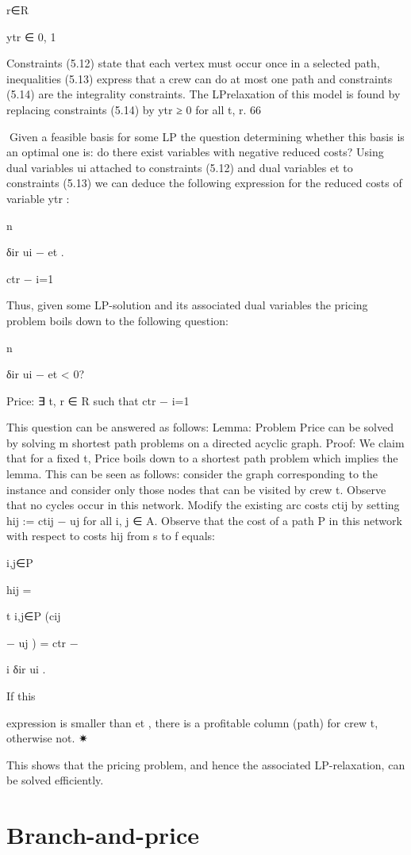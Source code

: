 r∈R

ytr ∈ {0, 1}

Constraints (5.12) state that each vertex must occur once in a selected path, inequalities (5.13) express
that a crew can do at most one path and constraints (5.14) are the integrality constraints. The LPrelaxation of this model is found by replacing constraints (5.14) by ytr ≥ 0 for all t, r.
66

Given a feasible basis for some LP the question determining whether this basis is an optimal one is: do
there exist variables with negative reduced costs? Using dual variables ui attached to constraints (5.12)
and dual variables et to constraints (5.13) we can deduce the following expression for the reduced costs
of variable ytr :

n

δir ui − et .

ctr −
i=1

Thus, given some LP-solution and its associated dual variables the pricing problem boils down to the
following question:

n

δir ui − et < 0?

Price: ∃ t, r ∈ R such that ctr −
i=1

This question can be answered as follows:
Lemma: Problem Price can be solved by solving m shortest path problems on a directed acyclic graph.
Proof: We claim that for a fixed t, Price boils down to a shortest path problem which implies the lemma.
This can be seen as follows: consider the graph corresponding to the instance and consider only those
nodes that can be visited by crew t. Observe that no cycles occur in this network. Modify the existing
arc costs ctij by setting hij := ctij − uj for all {i, j} ∈ A. Observe that the cost of a path P in this network
with respect to costs hij from s to f equals:

{i,j}∈P

hij =

t
{i,j}∈P (cij

− uj ) = ctr −

i δir ui .

If this

expression is smaller than et , there is a profitable column (path) for crew t, otherwise not.
✷

This shows that the pricing problem, and hence the associated LP-relaxation, can be solved efficiently.

\section{Branch-and-price}

